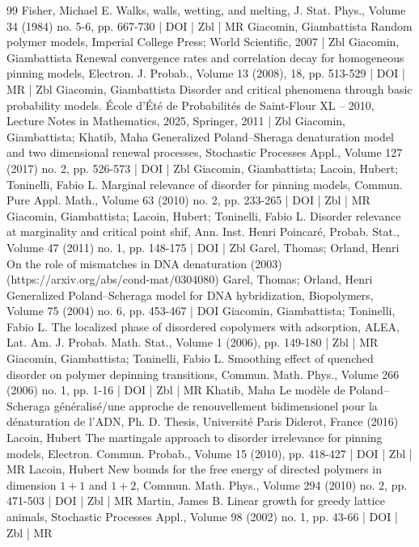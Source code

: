 \begin{thebibliography}{99}
Fisher, Michael E. Walks, walls, wetting, and melting, J. Stat. Phys., Volume 34 (1984) no. 5-6, pp. 667-730 | DOI | Zbl | MR
Giacomin, Giambattista Random polymer models, Imperial College Press; World Scientific, 2007 | Zbl
Giacomin, Giambattista Renewal convergence rates and correlation decay for homogeneous pinning models, Electron. J. Probab., Volume 13 (2008), 18, pp. 513-529 | DOI | MR | Zbl
Giacomin, Giambattista Disorder and critical phenomena through basic probability models. École d’Été de Probabilités de Saint-Flour XL – 2010, Lecture Notes in Mathematics, 2025, Springer, 2011 | Zbl
Giacomin, Giambattista; Khatib, Maha Generalized Poland–Sheraga denaturation model and two dimensional renewal processes, Stochastic Processes Appl., Volume 127 (2017) no. 2, pp. 526-573 | DOI | Zbl
Giacomin, Giambattista; Lacoin, Hubert; Toninelli, Fabio L. Marginal relevance of disorder for pinning models, Commun. Pure Appl. Math., Volume 63 (2010) no. 2, pp. 233-265 | DOI | Zbl | MR
Giacomin, Giambattista; Lacoin, Hubert; Toninelli, Fabio L. Disorder relevance at marginality and critical point shif, Ann. Inst. Henri Poincaré, Probab. Stat., Volume 47 (2011) no. 1, pp. 148-175 | DOI | Zbl
Garel, Thomas; Orland, Henri On the role of mismatches in DNA denaturation (2003) (https://arxiv.org/abs/cond-mat/0304080)
Garel, Thomas; Orland, Henri Generalized Poland–Scheraga model for DNA hybridization, Biopolymers, Volume 75 (2004) no. 6, pp. 453-467 | DOI
Giacomin, Giambattista; Toninelli, Fabio L. The localized phase of disordered copolymers with adsorption, ALEA, Lat. Am. J. Probab. Math. Stat., Volume 1 (2006), pp. 149-180 | Zbl | MR
Giacomin, Giambattista; Toninelli, Fabio L. Smoothing effect of quenched disorder on polymer depinning transitions, Commun. Math. Phys., Volume 266 (2006) no. 1, pp. 1-16 | DOI | Zbl | MR
Khatib, Maha Le modèle de Poland–Scheraga généralisé/une approche de renouvellement bidimensionel pour la dénaturation de l’ADN, Ph. D. Thesis, Université Paris Diderot, France (2016)
Lacoin, Hubert The martingale approach to disorder irrelevance for pinning models, Electron. Commun. Probab., Volume 15 (2010), pp. 418-427 | DOI | Zbl | MR
Lacoin, Hubert New bounds for the free energy of directed polymers in dimension $1+1$ and $1+2$, Commun. Math. Phys., Volume 294 (2010) no. 2, pp. 471-503 | DOI | Zbl | MR
Martin, James B. Linear growth for greedy lattice animals, Stochastic Processes Appl., Volume 98 (2002) no. 1, pp. 43-66 | DOI | Zbl | MR

\end{thebibliography}
